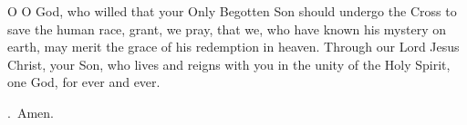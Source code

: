 \lettrine[lines=3]{O}{} O God, who willed that your Only Begotten Son
should undergo the Cross to save the human race,
grant, we pray,
that we, who have known his mystery on earth,
may merit the grace of his redemption in heaven.
Through our Lord Jesus Christ, your Son,
who lives and reigns with you in the unity of the Holy Spirit,
one God, for ever and ever. \par \Rbar.~Amen.
